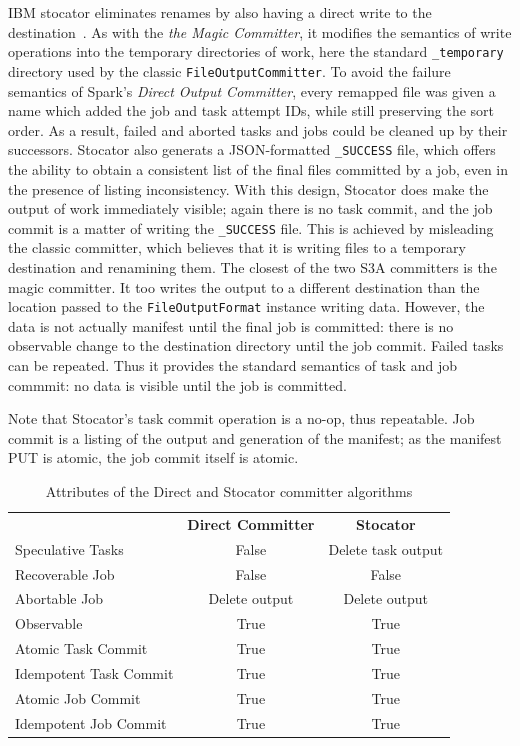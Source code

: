 \documentclass[conference]{IEEEtran}
\begin{document}
IBM stocator eliminates renames by also having a direct write to the
destination\ \cite{Stocator}.
As with the \emph{the Magic Committer}, it modifies the semantics of write
operations into the temporary directories of work, here the standard
\texttt{\_temporary} directory used by the classic \texttt{FileOutputCommitter}.
To avoid the failure semantics of Spark's \emph{Direct Output Committer},
every remapped file was given a name which added the job and task attempt IDs,
while still preserving the sort order.
As a result, failed and aborted tasks and jobs could be cleaned up by their successors.
Stocator also generats a JSON-formatted \texttt{\_SUCCESS} file, which offers
the ability to obtain a consistent list of the final files committed by a job,
even in the presence of listing inconsistency.
With this design, Stocator does make the output of work immediately visible;
again there is no task commit, and the job commit is a matter of writing
the \texttt{\_SUCCESS} file.
This is achieved by misleading the classic committer, which believes that
it is writing files to a temporary destination and renamining them.
The closest of the two S3A committers is the magic committer.
It too writes the output to a different destination than the location passed
to the \texttt{FileOutputFormat} instance writing data.
However, the data is not actually manifest until the final job is committed:
there is no observable change to the destination directory until the job commit.
Failed tasks can be repeated.
Thus it provides the standard semantics of task and job commmit: no data is
visible until the job is committed.

Note that Stocator's task commit operation is a no-op, thus repeatable.
Job commit is a listing of the output and generation of the manifest;
as the manifest PUT is atomic, the job commit itself is atomic.

\begin{table}
  \label{tab:other-committer-attributes}
  \begin{tabular}{ l c c }
    \hline
    & \textbf{Direct Committer} & \textbf{Stocator} \\
    Speculative Tasks & False & Delete task output \\
    Recoverable Job & False & False \\
    Abortable Job & Delete output & Delete output \\
    Observable & True & True \\
    Atomic Task Commit & True & True \\
    Idempotent Task Commit & True & True \\
    Atomic Job Commit & True & True \\
    Idempotent Job Commit & True & True \\
    \hline
  \end{tabular}
  \caption{Attributes of the Direct and Stocator committer algorithms}
\end{table}
\end{document}
